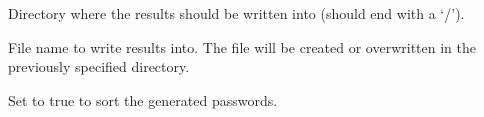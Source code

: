 \documentclass[letterpaper,10pt,english]{sphinxmanual}
\begin{document}

\begin{fulllineitems}
\label{\detokenize{usage:dir}}
\sphinxAtStartPar
Directory where the results should be written into (should end with a ‘/’).

\begin{sphinxVerbatim}[commandchars=\\\{\}]
   
\end{sphinxVerbatim}

\end{fulllineitems}


\begin{fulllineitems}
\label{\detokenize{usage:fd}}
\sphinxAtStartPar
File name to write results into. The file will be created or overwritten in the previously specified directory.

\begin{sphinxVerbatim}[commandchars=\\\{\}]
   
\end{sphinxVerbatim}

\end{fulllineitems}


\begin{fulllineitems}
\label{\detokenize{usage:sort}}
\sphinxAtStartPar
Set to true to sort the generated passwords.

\begin{sphinxVerbatim}[commandchars=\\\{\}]
  
\end{sphinxVerbatim}

\end{fulllineitems}

\end{document}
